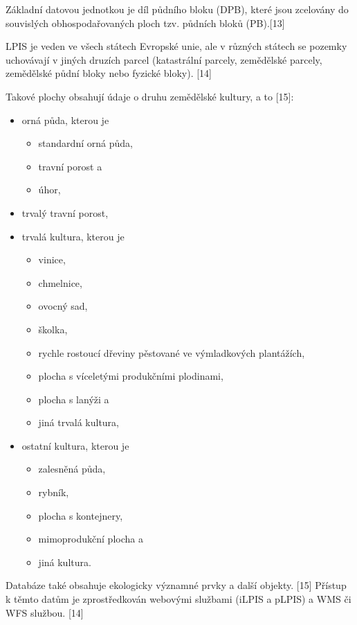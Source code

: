 \documentclass[a4paper,oneside,12pt]{book}
\begin{document}
\hspace{10mm} Základní datovou jednotkou je díl půdního bloku (DPB), které jsou zcelovány do souvislých obhospodařovaných ploch tzv. půdních bloků (PB).[13]

\hspace{10mm} LPIS je veden ve všech státech Evropské unie, ale v různých státech se pozemky uchovávají v jiných druzích parcel (katastrální parcely, zemědělské parcely, zemědělské půdní bloky nebo fyzické bloky). [14]

Takové plochy obsahují údaje o druhu zemědělské kultury, a to [15]:
\begin{itemize}
    \item orná půda, kterou je
    \begin{itemize}
        \item standardní orná půda,
        \item travní porost a
        \item úhor,
    \end{itemize}
    \item trvalý travní porost,
    \item trvalá kultura, kterou je
    \begin{itemize}
        \item vinice,
        \item chmelnice,
        \item ovocný sad,
        \item školka,
        \item rychle rostoucí dřeviny pěstované ve výmladkových plantážích,
        \item plocha s víceletými produkčními plodinami,
        \item plocha s lanýži a
        \item jiná trvalá kultura, 
    \end{itemize}
    \item ostatní kultura, kterou je
    \begin{itemize}
        \item zalesněná půda,
        \item rybník,
        \item plocha s kontejnery,
        \item mimoprodukční plocha a
        \item jiná kultura.
    \end{itemize}
\end{itemize}

\hspace{10mm} Databáze také obsahuje ekologicky významné prvky a další objekty. [15]
Přístup k těmto datům je zprostředkován webovými službami (iLPIS a pLPIS)  a WMS či WFS službou. [14]
\end{document}
